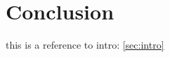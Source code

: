 \documentclass[../main.tex]{subfiles}
\begin{document}
\section{Conclusion} \label{sec:conclusion}
this is a reference to intro: \ref{sec:intro}
\end{document}
